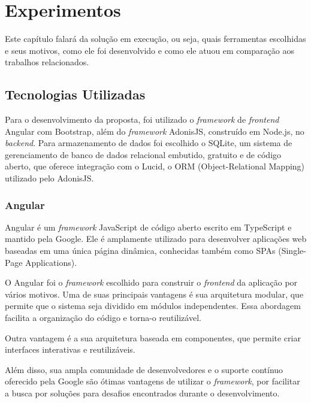 \chapter{Experimentos}\label{chp:EXPERIMENTOS}

Este capítulo falará da solução em execução, ou seja, quais ferramentas escolhidas e seus motivos, como ele foi desenvolvido e como ele atuou em comparação aos trabalhos relacionados.

\section{Tecnologias Utilizadas}

Para o desenvolvimento da proposta, foi utilizado o \textit{framework} de \textit{frontend} Angular com Bootstrap, além do \textit{framework} AdonisJS, construído em Node.js, no \textit{backend}. Para armazenamento de dados foi escolhido o SQLite, um sistema de gerenciamento de banco de dados relacional embutido, gratuito e de código aberto, que oferece integração com o Lucid, o ORM (Object-Relational Mapping) utilizado pelo AdonisJS.

\subsection{Angular}
Angular é um \textit{framework} JavaScript de código aberto escrito em TypeScript e mantido pela Google. Ele é amplamente utilizado para desenvolver aplicações web baseadas em uma única página dinâmica, conhecidas também como SPAs (Single-Page Applications).

O Angular foi o \textit{framework} escolhido para construir o \textit{frontend} da aplicação por vários motivos. Uma de suas principais vantagens é sua arquitetura modular, que permite que o sistema seja dividido em módulos independentes. Essa abordagem facilita a organização do código e torna-o reutilizável. 

Outra vantagem é a sua arquitetura baseada em componentes, que permite criar interfaces interativas e reutilizáveis. 

Além disso, sua ampla comunidade de desenvolvedores e o suporte contínuo oferecido pela Google são ótimas vantagens de utilizar o \textit{framework}, por facilitar a busca por soluções para desafios encontrados durante o desenvolvimento.



